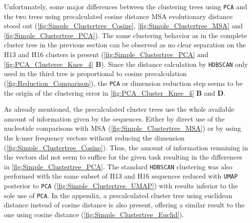 \vspace{1em}

Unfortunately, some major differences between the clustering trees using \texttt{PCA} and the two trees using precalculated cosine distance \gls{MSA} evolutionary distance stood out (\autoref{fig:Simple_Clustertree_Cosine}, \autoref{fig:Simple_Clustertree_MSA} and \autoref{fig:Simple_Clustertree_PCA}). The same clustering behavior as in the complete cluster tree in the previous section can be observed as no clear separation on the H13 and H16 clusters is present (\autoref{fig:Simple_Clustertree_PCA} and \autoref{fig:PCA_Clusteree_Knee_4} \textbf{\textsf{B}}). Since the distance calculation by \texttt{HDBSCAN} only used in the third tree is proportional to cosine precalculation (\autoref{fig:Reduction_Comparison}), the \texttt{PCA} or dimension reduction step seems to be the origin of the clustering error in \autoref{fig:PCA_Cluster_Knee_4} \textbf{\textsf{B}} and \textbf{\textsf{D}}. 

\vspace{1em}

As already mentioned, the precalculated cluster trees use the whole available amount of information given by the sequences. Either by direct use of the nucleotide comparisons with \gls{MSA} (\autoref{fig:Simple_Clustertree_MSA}) or by using the k-mer frequency vectors without reducing the dimension (\autoref{fig:Simple_Clustertree_Cosine}). Thus, the amount of information remaining in the vectors did not seem to suffice for the given task resulting in the differences in \autoref{fig:Simple_Clustertree_PCA}. The standard \texttt{HDBSCAN} clustering was also performed with the same subset of H13 and H16 sequences reduced with \texttt{UMAP} posterior to \texttt{PCA} (\autoref{fig:Simple_Clustertree_UMAP}) with results inferior to the sole use of \texttt{PCA}. In the appendix, a precalculated cluster tree using euclidean distance instead of cosine distance is also present, offering a similar result to the one using cosine distance (\autoref{fig:Simple_Clustertree_Euclid}).